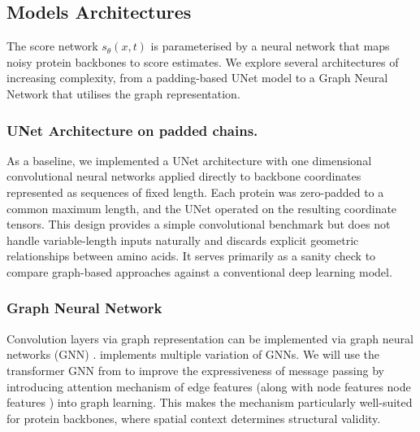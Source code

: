 \documentclass[a4paper,12pt]{article}
\begin{document}
\subsection{Models Architectures}\label{subsec:architectures}
The score network \(s_\theta(x,t)\) is parameterised by a neural network that maps noisy protein backbones to score estimates. We explore several architectures of increasing complexity, from a padding-based UNet model to a Graph Neural Network that utilises the graph representation.

\subsubsection{UNet Architecture on padded chains.}
As a baseline, we implemented a UNet architecture \citep{ronneberger2015UNetConvolutionalNetworks} with one dimensional convolutional neural networks applied directly to backbone coordinates represented as sequences of fixed length. Each protein was zero-padded to a common maximum length, and the UNet operated on the resulting coordinate tensors. This design provides a simple convolutional benchmark but does not handle variable-length inputs naturally and discards explicit geometric relationships between amino acids. It serves primarily as a sanity check to compare graph-based approaches against a conventional deep learning model.

\subsubsection{Graph Neural Network}
Convolution layers via graph representation can be implemented via graph neural networks (GNN) \citep{scarselliGraphNeuralNetwork2009}.
\citet{PyG1.0,PyG2.0} implements multiple variation of GNNs. We will use the transformer GNN from \citet{shi2021MaskedLabelPrediction} to improve the expressiveness of message passing by introducing attention mechanism of edge features (along with node features node features \citep{velickovicGraphAttentionNetworks2018}) into graph learning.
This makes the mechanism particularly well-suited for protein backbones, 
where spatial context determines structural validity. %
\end{document}
